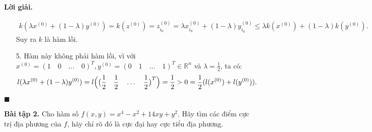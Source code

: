 \documentclass[12pt]{article}
\newcommand{\R}{\mathbb{R}}
\newenvironment{solution}{%
     \setlength\parindent{0pt}\par\medskip\textbf{Lời giải.}\quad}{%
     \hfill\tiny$\blacksquare$\par\medskip}
\begin{document}
\begin{solution}
\begin{enumerate}
            \begin{align*}
                k(\lambda x^{(0)} + (1 - \lambda)y^{(0)}) = k(z^{(0)}) = z_{i_0}^{(0)} = \lambda x_{i_0}^{(0)} + (1 - \lambda)y_{i_0}^{(0)} \leq \lambda k(x^{(0)}) + (1 - \lambda)k(y^{(0)}).
            \end{align*}
            Suy ra $k$ là hàm lồi.
            \item[5.] Hàm này không phải hàm lồi, vì với $x^{(0)} = (1 \quad 0 \quad \ldots \quad 0)^T, y^{(0)} = (0 \quad 1 \quad \ldots \quad 1)^T \in \R^n$ và $\lambda = \frac{1}{2}$, ta có:
            \begin{align*}
                l(\lambda x^{(0)} + (1 - \lambda)y^{(0)}) = l \Bigl(\bigl(\frac{1}{2} \quad \frac{1}{2} \quad \ldots \quad \frac{1}{2}\bigr)^T\Bigr) = \frac{1}{2} > 0 = \frac{1}{2}(l(x^{(0)}) + l(y^{(0)})).
            \end{align*}
        \end{enumerate}
    \end{solution}
    \textbf{Bài tập 2.} Cho hàm số $f(x, y) = x^4 - x^2 + 14xy + y^2$. Hãy tìm các điểm cực trị địa phương của $f$, hãy chỉ rõ đó là cực đại hay cực tiểu địa phương.
\end{document}
